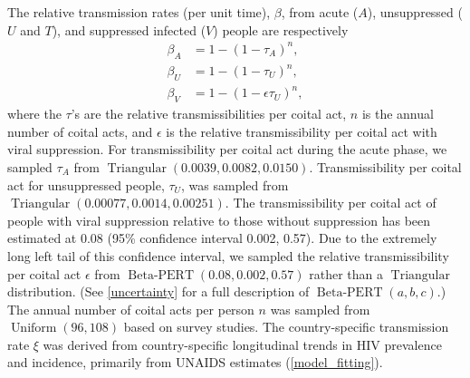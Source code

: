 \documentclass{article}
\DeclareMathOperator{\Uniform}{Uniform}
\DeclareMathOperator{\Triangular}{Triangular}
\DeclareMathOperator{\BetaPERT}{Beta-PERT}
\begin{document}
The relative transmission rates (per unit time), $\beta$, from acute
($A$), unsuppressed ($U$ and $T$), and suppressed infected ($V$)
people are respectively
\begin{equation}
  \label{betas}
  \begin{split}
    \beta_A &= 1 - (1 - \tau_A)^n,
    \\
    \beta_U &= 1 - (1 - \tau_U)^n,
    \\
    \beta_V &= 1 - (1 - \epsilon \tau_U)^n,
  \end{split}
\end{equation}
where the $\tau$'s are the relative transmissibilities per coital act,
$n$ is the annual number of coital acts, and $\epsilon$ is the
relative transmissibility per coital act with viral suppression.  For
transmissibility per coital act during the acute phase, we sampled
$\tau_A$ from
$\Triangular(0.0039, 0.0082,
0.0150)$.\cite{Wawer2005-us,
  Skarbinski2015-ni}
Transmissibility per coital act for unsuppressed people, $\tau_U$, was
sampled from
$\Triangular(0.00077, 0.0014, 0.00251)$.\cite{Hughes2012-so} The
transmissibility per coital act of people with viral suppression
relative to those without suppression has been estimated at 0.08 (95\%
confidence interval 0.002, 0.57).\cite{Donnell2010-xo} Due to the
extremely long left tail of this confidence interval, we sampled the
relative transmissibility per coital act $\epsilon$ from
$\BetaPERT(0.08, 0.002, 0.57)$ rather than a $\Triangular$
distribution.  (See \autoref{uncertainty} for a full description of
$\BetaPERT(a, b, c)$.)  The annual number of coital acts per person
$n$ was sampled from $\Uniform(96, 108)$ based on survey
studies.\cite{Wawer2005-us, Abdool_Karim2010-cm}  The country-specific
transmission rate $\xi$ was derived from country-specific longitudinal
trends in HIV prevalence and incidence, primarily from UNAIDS
estimates (\autoref{model_fitting}).
\end{document}
